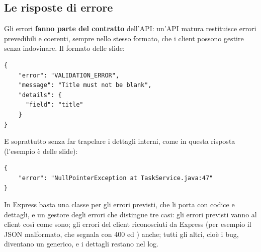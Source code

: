 \subsection{Le risposte di errore}

Gli errori \textbf{fanno parte del contratto} dell'API: un'API matura restituisce
errori prevedibili e coerenti, sempre nello stesso formato, che i client possono
gestire senza indovinare. Il formato delle slide:

\begin{lstlisting}[style=json, name=risposta di errore]
{
    "error": "VALIDATION_ERROR",
    "message": "Title must not be blank",
    "details": {
      "field": "title"
    }
}
\end{lstlisting}

E soprattutto senza far trapelare i dettagli interni, come in questa risposta
(l'esempio è delle slide):

\begin{lstlisting}[style=json, name=da evitare]
{
    "error": "NullPointerException at TaskService.java:47"
}
\end{lstlisting}

In Express basta una classe per gli errori previsti, che li porta con codice e
dettagli, e un gestore degli errori che distingue tre casi: gli errori previsti
vanno al client così come sono; gli errori del client riconosciuti da Express
(per esempio il JSON malformato, che  segnala con
 400 ed ) anche; tutti gli altri, cioè i bug,
diventano un  generico, e i dettagli restano nel log.

